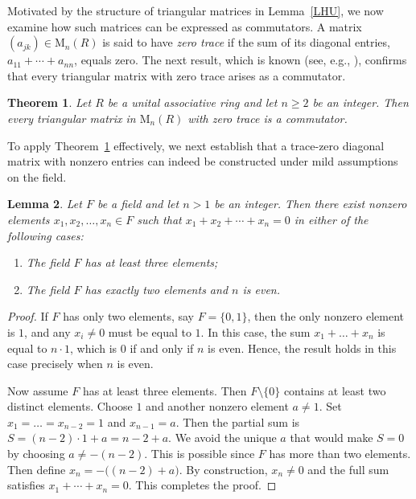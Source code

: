 \documentclass[11pt]{article}
\newtheorem{theorem}{Theorem}
\newtheorem{lemma}[theorem]{Lemma}
\theoremstyle{definition}
\begin{document}
{{{{				
				Motivated by the structure of triangular matrices in Lemma~\ref{LHU}, we now examine how such matrices can be expressed as commutators. A matrix $(a_{jk}) \in \mathrm{M}_n(R)$ is said to have \emph{zero trace} if the sum of its diagonal entries, $a_{11} + \cdots + a_{nn}$, equals zero. The next result, which is known (see, e.g., \cite[Theorem~4]{Pa_Ka_14}), confirms that every triangular matrix with zero trace arises as a commutator.
				
				\begin{theorem}
					\label{triangular trace zero}
					Let $R$ be a unital associative ring and let $n \geq 2$ be an integer. Then every triangular matrix in $\mathrm{M}_n(R)$ with zero trace is a commutator.
				\end{theorem}

				
				To apply Theorem~\ref{triangular trace zero} effectively, we next establish that a trace-zero diagonal matrix with nonzero entries can indeed be constructed under mild assumptions on the field.
				
				\begin{lemma}\label{choose}
					Let $F$ be a field and let $n > 1$ be an integer. Then there exist nonzero elements  $x_1, x_2, \dots, x_n \in F$ such that $x_1 + x_2 + \cdots + x_n = 0$ in either of the following cases:
					\begin{enumerate}[\rm (i)]
						\item The field $F$ has at least three elements;
						\item The field $F$ has exactly two elements  and $n$ is even.
					\end{enumerate}
				\end{lemma}
				
				\begin{proof}
					If $F$ has only two elements, say $F = \{0,1\}$, then the only nonzero element is $1$, and any $x_i \ne 0$ must be equal to $1$. In this case, the sum $x_1 + \dots + x_n$ is equal to $n \cdot 1$, which is $0$ if and only if $n$ is even. Hence, the result holds in this case precisely when $n$ is even.
					
					Now assume $F$ has at least three elements. Then  $F\setminus\{0\}$ contains at least two distinct elements. Choose $1$ and another nonzero element $a \ne 1$. Set
					$x_1 = \dots = x_{n-2} = 1$ and $x_{n-1} = a.$
					Then the partial sum is
					$S = (n-2)\cdot1 + a = n - 2 + a.$
					We avoid the unique $a$ that would make $S = 0$ by choosing $a \ne -(n-2)$. This is possible since $F$ has more than two elements. Then define
					$x_n = -\bigl((n - 2) + a\bigr).$
					By construction, $x_n \ne 0$ and the full sum satisfies
					$x_1 + \cdots + x_n = 0.$
					This completes the proof.
				\end{proof}
				
}}}}
\end{document}
